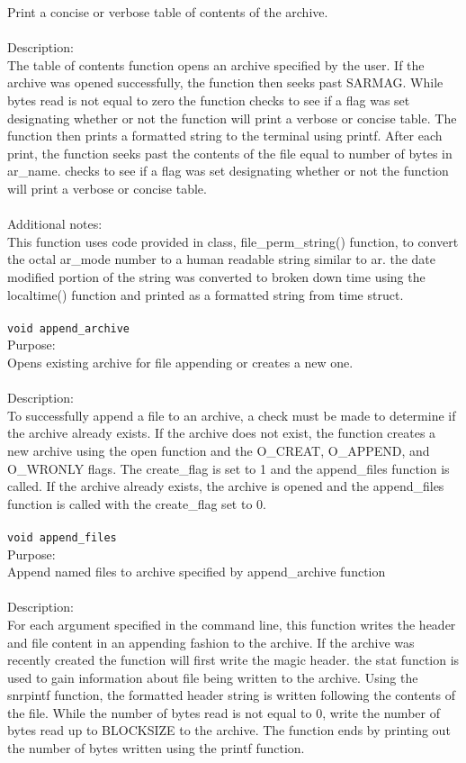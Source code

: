 \documentclass[12pt,letterpaper]{article}
\begin{document}
Print a concise or verbose table of contents of the archive.
\\\\
Description:
\\
The table of contents function opens an archive specified by the user. If the archive was opened successfully, the function then seeks past SARMAG. While bytes read is not equal to zero the function checks to see if a flag was set designating whether or not the function will print a verbose or concise table. The function then prints a formatted string to the terminal using printf. After each print, the function seeks past the contents of the file equal to number of bytes in ar\_name. checks to see if a flag was set designating whether or not the function will print a verbose or concise table. 
\\\\
Additional notes:
\\
This function uses code provided in class, file\_perm\_string() function, to convert the octal ar\_mode number to a human readable string similar to ar. the date modified portion of the string was converted to broken down time using the localtime() function and printed as a formatted string from time struct.
\\\\
\texttt{void append\_archive}
\\
Purpose:
\\
Opens existing archive for file appending or creates a new one.
\\\\
Description:
\\
To successfully append a file to an archive, a check must be made to determine if the archive already exists. If the archive does not exist, the function creates a new archive using the open function and the O\_CREAT, O\_APPEND, and O\_WRONLY flags. The create\_flag is set to 1 and the append\_files function is called. If the archive already exists, the archive is opened and the append\_files function is called with the create\_flag set to 0.
\\\\
\texttt{void append\_files}
\\
Purpose:
\\
Append named files to archive specified by append\_archive function
\\\\
Description:
\\
For each argument specified in the command line, this function writes the header and file content in an appending fashion to the archive. If the archive was recently created the function will first write the magic header. the stat function is used to gain information about file being written to the archive. Using the snrpintf function, the formatted header string is written following the contents of the file. While the number of bytes read is not equal to 0, write the number of bytes read up to BLOCKSIZE to the archive. The function ends by printing out the number of bytes written using the printf function.
\end{document}
